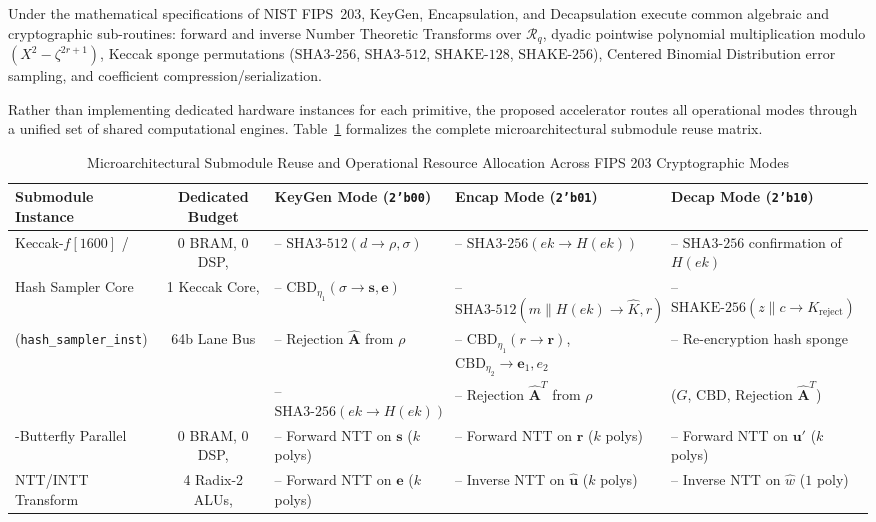 Under the mathematical specifications of NIST FIPS~203, KeyGen, Encapsulation, and Decapsulation execute common algebraic and cryptographic sub-routines: forward and inverse Number Theoretic Transforms over $\mathcal{R}_q$, dyadic pointwise polynomial multiplication modulo $(X^2 - \zeta^{2r+1})$, Keccak sponge permutations ($\text{SHA3-256}$, $\text{SHA3-512}$, $\text{SHAKE-128}$, $\text{SHAKE-256}$), Centered Binomial Distribution error sampling, and coefficient compression/serialization.

Rather than implementing dedicated hardware instances for each primitive, the proposed accelerator routes all operational modes through a unified set of shared computational engines. Table~\ref{tab:submodule_reuse} formalizes the complete microarchitectural submodule reuse matrix.

\begin{table}[!t]
\caption{Microarchitectural Submodule Reuse and Operational Resource Allocation Across FIPS 203 Cryptographic Modes}
\label{tab:submodule_reuse}
\centering
\footnotesize
\begin{tabular}{@{} l c p{4.2cm} p{4.2cm} p{4.5cm} @{}}
\toprule
\textbf{Submodule Instance} & \textbf{Dedicated Budget} & \textbf{KeyGen Mode (\texttt{2'b00})} & \textbf{Encap Mode (\texttt{2'b01})} & \textbf{Decap Mode (\texttt{2'b10})} \\
\midrule
Keccak-$f[1600]$ / & 0 BRAM, 0 DSP, & -- $\text{SHA3-512}(d \to \rho, \sigma)$ & -- $\text{SHA3-256}(ek \to H(ek))$ & -- $\text{SHA3-256}$ confirmation of $H(ek)$ \\
Hash Sampler Core & 1 Keccak Core, & -- $\text{CBD}_{\eta_1}(\sigma \to \mathbf{s}, \mathbf{e})$ & -- $\text{SHA3-512}(m \parallel H(ek) \to \hat{K}, r)$ & -- $\text{SHAKE-256}(z \parallel c \to K_{\text{reject}})$ \\
(\texttt{hash\_sampler\_inst}) & 64b Lane Bus & -- Rejection $\hat{\mathbf{A}}$ from $\rho$ & -- $\text{CBD}_{\eta_1}(r \to \mathbf{r})$, $\text{CBD}_{\eta_2} \to \mathbf{e}_1, e_2$ & -- Re-encryption hash sponge \\
& & -- $\text{SHA3-256}(ek \to H(ek))$ & -- Rejection $\hat{\mathbf{A}}^T$ from $\rho$ & \quad ($G$, $\text{CBD}$, Rejection $\hat{\mathbf{A}}^T$) \\
\addlinespace[3pt]
4-Butterfly Parallel & 0 BRAM, 0 DSP, & -- Forward NTT on $\mathbf{s}$ ($k$ polys) & -- Forward NTT on $\mathbf{r}$ ($k$ polys) & -- Forward NTT on $\mathbf{u}'$ ($k$ polys) \\
NTT/INTT Transform & 4 Radix-2 ALUs, & -- Forward NTT on $\mathbf{e}$ ($k$ polys) & -- Inverse NTT on $\hat{\mathbf{u}}$ ($k$ polys) & -- Inverse NTT on $\hat{w}$ ($1$ poly) \\

\end{tabular}
\end{table}
